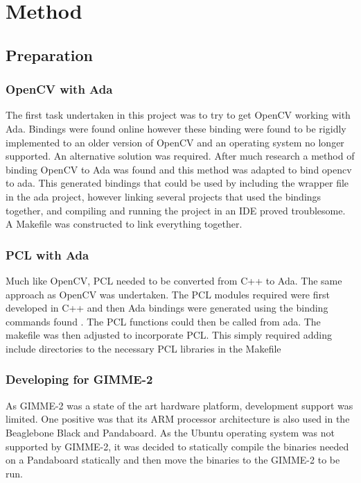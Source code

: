 \section{Method}\label{sec:method}
\subsection{Preparation}
\subsubsection{OpenCV with Ada}
The first task undertaken in this project was to try to get OpenCV working with Ada. Bindings were found online \cite{web:oldAdaBindings} however these binding were found to be rigidly implemented to an older version of OpenCV and an operating system no longer supported. An alternative solution was required. After much research a method of binding OpenCV to Ada was found \cite{web:newAdaBindings} and this method was adapted to bind opencv to ada. This generated bindings that could be used by including the wrapper file in the ada project, however linking several projects that used the bindings together, and compiling and running the project in an IDE proved troublesome. A Makefile was constructed to link everything together.

\subsubsection{PCL with Ada}
Much like OpenCV, PCL needed to be converted from C++ to Ada. The same approach as OpenCV was undertaken. The PCL modules required were first developed in C++ and then Ada bindings were generated using the binding commands found \cite{web:newAdaBindings}. The PCL functions could then be called from ada. The makefile was then adjusted to incorporate PCL. This simply required adding include directories to the necessary PCL libraries in the Makefile 

\subsubsection{Developing for GIMME-2}
As GIMME-2 was a state of the art hardware platform, development support was limited. One positive was that its ARM processor architecture is also used in the Beaglebone Black and Pandaboard. As the Ubuntu operating system was not supported by GIMME-2, it was decided to statically compile the binaries needed on a Pandaboard statically and then move the binaries to the GIMME-2 to be run.

